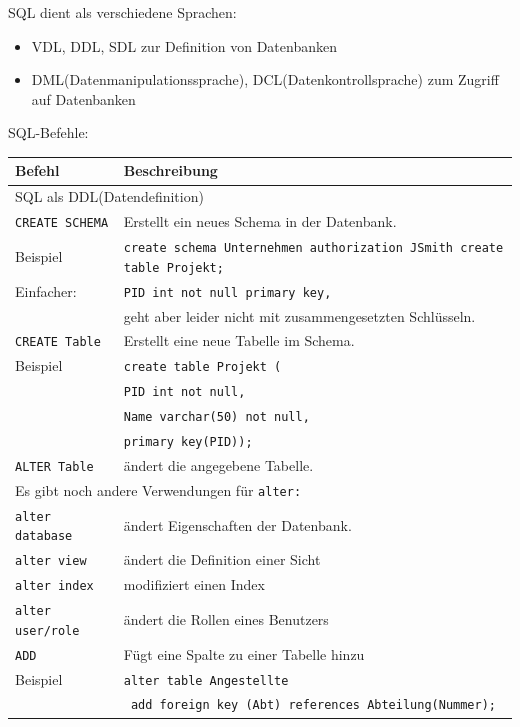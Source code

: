 \documentclass{article}
\begin{document}
SQL dient als verschiedene Sprachen:
\begin{itemize}
  \item VDL, DDL, SDL zur Definition von Datenbanken
  \item DML(Datenmanipulationssprache), DCL(Datenkontrollsprache) zum Zugriff auf Datenbanken
\end{itemize}
SQL-Befehle:
\begin{center}
  \begin{tabular}{|p{4cm}|p{7cm}|}
    \hline
    \textbf{Befehl} & \textbf{Beschreibung} \\
    \hline
    \multicolumn{2}{|p{11cm}|}{SQL als DDL(Datendefinition)} \\
    \hline
    \texttt{CREATE SCHEMA} & Erstellt ein neues Schema in der Datenbank. \\
    \hline    
    Beispiel & \texttt{create schema Unternehmen authorization JSmith create table Projekt;} \\
    \hline
    Einfacher: & \texttt{PID int not null primary key,} \\
    & geht aber leider nicht mit zusammengesetzten Schlüsseln. \\
    \hline
    \texttt{CREATE Table} & Erstellt eine neue Tabelle im Schema. \\
    \hline
    Beispiel & \texttt{create table Projekt (} \\ & \texttt{PID int not null,} \\ & \texttt{Name varchar(50) not null, } \\ & \texttt{primary key(PID));} \\
    \hline
    \texttt{ALTER Table} & ändert die angegebene Tabelle. \\
    \hline
    \multicolumn{2}{|p{11cm}|}{Es gibt noch andere Verwendungen für \texttt{alter:}} \\
    \texttt{alter database} & ändert Eigenschaften der Datenbank. \\
    \texttt{alter view} & ändert die Definition einer Sicht \\
    \texttt{alter index} & modifiziert einen Index \\
    \texttt{alter user/role} & ändert die Rollen eines Benutzers \\
    \hline
    \texttt{ADD} & Fügt eine Spalte zu einer Tabelle hinzu \\
    \hline
    Beispiel & \texttt{alter table Angestellte} \\
    & \texttt{ add foreign key (Abt) references Abteilung(Nummer);} \\
    \hline
  \end{tabular}
\end{center}
\end{document}
